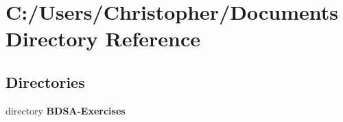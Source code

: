 \section{C\+:/\+Users/\+Christopher/\+Documents Directory Reference}
\label{dir_2ae2a55772f6ad917d9e62c22fd6920d}
\subsection*{Directories}
\begin{DoxyCompactItemize}
\item 
directory {\bf B\+D\+S\+A-\/\+Exercises}
\end{DoxyCompactItemize}
